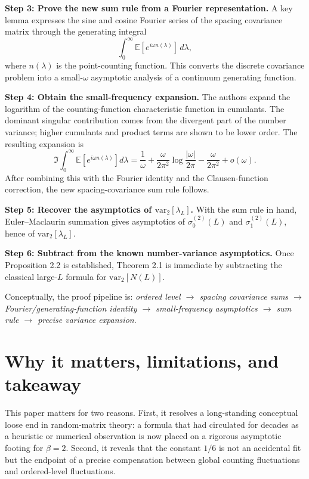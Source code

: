 \documentclass[11pt]{article}
\begin{document}
\textbf{Step 3: Prove the new sum rule from a Fourier representation.}
A key lemma expresses the sine and cosine Fourier series of the spacing covariance matrix through the generating integral
\[
\int_0^{\infty} \mathbb E[e^{i\omega n(\lambda)}] \, d\lambda,
\]
where $n(\lambda)$ is the point-counting function. This converts the discrete covariance problem into a small-$\omega$ asymptotic analysis of a continuum generating function.

\textbf{Step 4: Obtain the small-frequency expansion.}
The authors expand the logarithm of the counting-function characteristic function in cumulants. The dominant singular contribution comes from the divergent part of the number variance; higher cumulants and product terms are shown to be lower order. The resulting expansion is
\[
\Im\int_0^{\infty}\mathbb E[e^{i\omega n(\lambda)}]d\lambda
=\frac1\omega+\frac{\omega}{2\pi^2}\log\frac{|\omega|}{2\pi}-\frac{\omega}{2\pi^2}+o(\omega).
\]
After combining this with the Fourier identity and the Clausen-function correction, the new spacing-covariance sum rule follows.

\textbf{Step 5: Recover the asymptotics of $\mathrm{var}_2[\lambda_L]$.}
With the sum rule in hand, Euler--Maclaurin summation gives asymptotics of $\sigma_0^{(2)}(L)$ and $\sigma_1^{(2)}(L)$, hence of $\mathrm{var}_2[\lambda_L]$.

\textbf{Step 6: Subtract from the known number-variance asymptotics.}
Once Proposition 2.2 is established, Theorem 2.1 is immediate by subtracting the classical large-$L$ formula for $\mathrm{var}_2[N(L)]$.

Conceptually, the proof pipeline is: \emph{ordered level $\to$ spacing covariance sums $\to$ Fourier/generating-function identity $\to$ small-frequency asymptotics $\to$ sum rule $\to$ precise variance expansion}.

\section*{Why it matters, limitations, and takeaway}
This paper matters for two reasons. First, it resolves a long-standing conceptual loose end in random-matrix theory: a formula that had circulated for decades as a heuristic or numerical observation is now placed on a rigorous asymptotic footing for $\beta=2$. Second, it reveals that the constant $1/6$ is not an accidental fit but the endpoint of a precise compensation between global counting fluctuations and ordered-level fluctuations.
\end{document}
